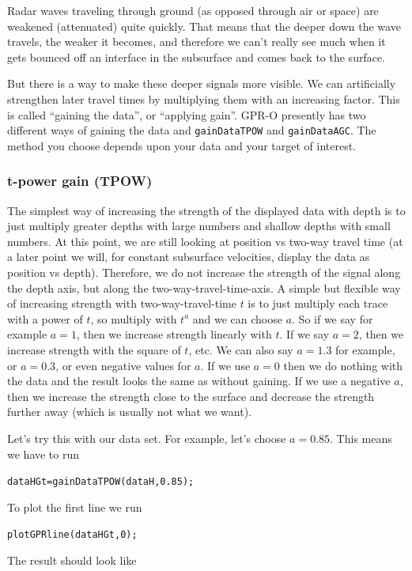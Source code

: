 \documentclass[11pt]{article}
\begin{document}
Radar waves traveling through ground (as opposed
through air or space) are weakened (attenuated) quite
quickly. That means that the deeper down the wave travels, the weaker it
becomes, and therefore we can't really see much when it gets bounced off an
interface in the subsurface and comes back to the surface.
 
But there is a way to make these deeper signals more visible. We can
artificially strengthen later travel times by multiplying them with an
increasing factor. This is called ``gaining the data'', or ``applying
gain''. GPR-O presently has two different ways of gaining the data and
\verb#gainDataTPOW# and \verb#gainDataAGC#. The method you choose depends
upon your data and your target of interest.


\subsubsection{t-power gain (TPOW)}

The simplest way of increasing the strength of the displayed data with
depth is to just multiply greater depths with large numbers and
shallow depths with small numbers. At this point, we are still looking
at position vs two-way travel time (at a later point we will, for
constant subsurface velocities, display the data as position vs
depth). Therefore, we do not increase the strength of the signal along
the depth axis, but along the two-way-travel-time-axis. A simple but
flexible way of increasing strength with two-way-travel-time $t$ is to
just multiply each trace with a power of $t$, so multiply with $t^a$
and we can choose $a$. So if we say for example $a=1$, then we
increase strength linearly with $t$. If we say $a=2$, then we increase
strength with the square of $t$, etc. We can also say $a=1.3$ for
example, or $a=0.3$, or even negative values for $a$. If we use $a=0$
then we do nothing with the data and the result looks the same as
without gaining. If we use a negative $a$, then we increase the strength
close to the surface and decrease the strength further away (which is
usually not what we want).

Let's try this with our data set. For example, let's choose
$a=0.85$. This means we have to run

\qquad \verb#dataHGt=gainDataTPOW(dataH,0.85);#

To plot the first line we run

\qquad \verb#plotGPRline(dataHGt,0);#

The result should look like
\end{document}
